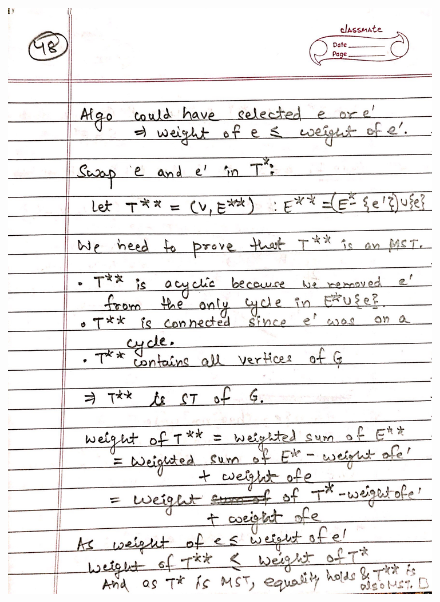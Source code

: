 \begin{figure}[H]
    \centering
    \includegraphics[width=16cm, height=21cm]{"./MIT-6.042J/MIT-6042J-048"}
\end{figure}
\newpage
